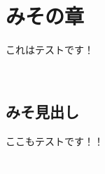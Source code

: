 \chapter{みその章}
\label{chap:chapxx-miso}

これはテストです！

\begin{reviewimage}%
\includegraphics[width=\maxwidth]{./images/chapxx-miso/dummy.png}%
\label{image:chapxx-miso:dummy}
\end{reviewimage}

\section{みそ見出し}
\label{sec:8-1}

ここもテストです！！

\begin{reviewimage}%
\includegraphics[width=2.0\maxwidth]{./images/chapxx-miso/dummy.png}%
\label{image:chapxx-miso:dummy}
\end{reviewimage}
